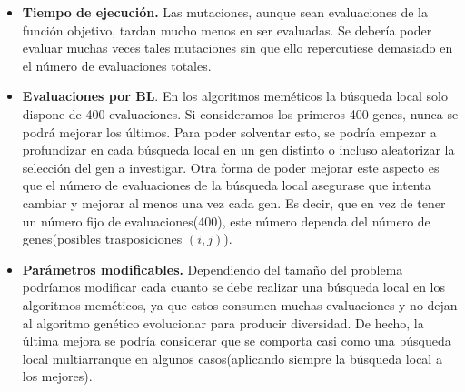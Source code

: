 \begin{itemize}
	\item \textbf{Tiempo de ejecución.} Las mutaciones, aunque sean evaluaciones de la función objetivo, tardan mucho menos en ser evaluadas. Se debería poder evaluar muchas veces tales mutaciones sin que ello repercutiese demasiado en el número de evaluaciones totales.
	
	\item \textbf{Evaluaciones por BL}. En los algoritmos meméticos la búsqueda local solo dispone de 400 evaluaciones. Si consideramos los primeros 400 genes, nunca se podrá mejorar los últimos. Para poder solventar esto, se podría empezar a profundizar en cada búsqueda local en un gen distinto o incluso aleatorizar la selección del gen a investigar. Otra forma de poder mejorar este aspecto es que el número de evaluaciones de la búsqueda local asegurase que intenta cambiar y mejorar al menos una vez cada gen. Es decir, que en vez de tener un número fijo de evaluaciones(400), este número dependa del número de genes(posibles trasposiciones $(i,j)$).
	
	\item \textbf{Parámetros modificables.} Dependiendo del tamaño del problema podríamos modificar cada cuanto se debe realizar una búsqueda local en los algoritmos meméticos, ya que estos consumen muchas evaluaciones y no dejan al algoritmo genético evolucionar para producir diversidad. De hecho, la última mejora se podría considerar que se comporta casi como una búsqueda local multiarranque en algunos casos(aplicando siempre la búsqueda local a los mejores).
	
\end{itemize}














